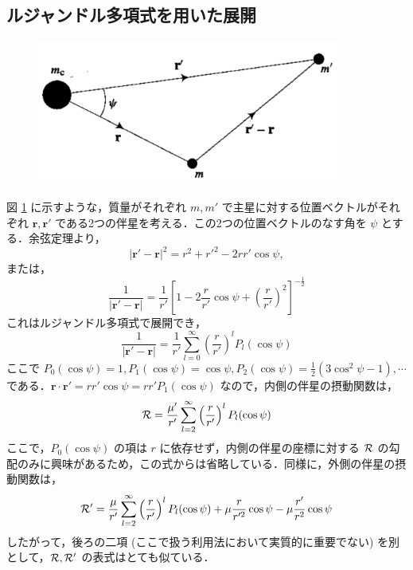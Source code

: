 \documentclass[11pt,a4paper,oneside,onecolumn]{jarticle}
\begin{document}
\subsection{ルジャンドル多項式を用いた展開}
\begin{figure}[H]
\centering
\includegraphics[width=10cm]{./image/sec6_2.pdf}
\caption{\label{fig:disturbingfunc_psi}}
\end{figure}
図 \ref{fig:disturbingfunc_psi} に示すような，質量がそれぞれ $m, m'$ で主星に対する位置ベクトルがそれぞれ ${\bm r}, {\bm r'}$ である2つの伴星を考える．この2つの位置ベクトルのなす角を $\psi$ とする．余弦定理より，
\begin{equation}
|{\bm r'} - {\bm r}|^2 = r^2 + r'^2 - 2 r r' \cos \psi,
\end{equation}
または，
\begin{equation}
\frac{1}{|{\bm r'} - {\bm r}|} = \frac{1}{r'} \left[ 1 - 2 \frac{r}{r'} \cos \psi + \left( \frac{r}{r'} \right)^2 \right]^{-\frac{1}{2}}
\end{equation}
これはルジャンドル多項式で展開でき，
\begin{equation}
\frac{1}{|{\bm r'} - {\bm r}|} = \frac{1}{r'} \sum_{l = 0}^{\infty} \left( \frac{r}{r'} \right)^l P_l (\cos \psi)
\end{equation}
ここで $P_0 (\cos \psi) = 1, P_1 (\cos \psi) = \cos \psi, P_2 (\cos \psi) = \frac{1}{2} (3 \cos^2 \psi - 1), \cdots$ である．${\bm r} \cdot {\bm r'} = r r' \cos \psi = r r' P_1 (\cos \psi)$ なので，内側の伴星の摂動関数は，
\begin{equation}
{\cal R} = \frac{\mu'}{r'} \sum_{l = 2}^{\infty} \left( \frac{r}{r'} \right)^l P_l (\cos \psi) \label{eq:cal_R2}
\end{equation}
ここで，$P_0 (\cos \psi)$ の項は $r$ に依存せず，内側の伴星の座標に対する ${\cal R}$ の勾配のみに興味があるため，この式からは省略している．同様に，外側の伴星の摂動関数は，
\begin{equation}
{\cal R'} = \frac{\mu}{r'} \sum_{l = 2}^{\infty} \left( \frac{r}{r'} \right)^l P_l (\cos \psi) + \mu \frac{r}{r'^2} \cos \psi - \mu \frac{r'}{r^2} \cos \psi
\end{equation}
したがって，後ろの二項 (ここで扱う利用法において実質的に重要でない) を別として，${\cal R}, {\cal R'}$ の表式はとても似ている．
\end{document}
